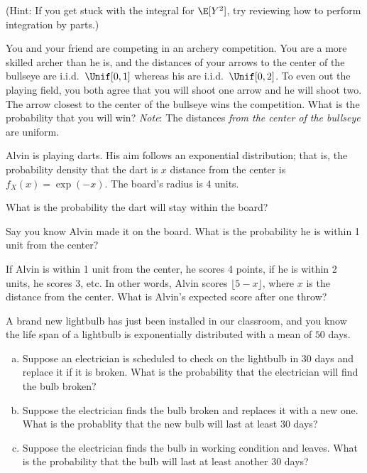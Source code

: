 (Hint: If you get stuck with the integral for $\E[Y^2]$, try reviewing how to perform integration by parts.)


You and your friend are competing in an archery competition. You are a more skilled archer than he is, and the distances of your arrows to the center of the bullseye are i.i.d.\ $\Unif[0,1]$ whereas his are i.i.d.\ $\Unif[0, 2]$. To even out the playing field, you both agree that you will shoot one arrow and he will shoot two. The arrow closest to the center of the bullseye wins the competition. What is the probability that you will win? \textit{Note}: The distances \textit{from the center of the bullseye} are uniform.
\nosolspace{6cm}



Alvin is playing darts.
His aim follows an exponential distribution; that is, the probability density that the dart is $x$ distance from the center is $f_X(x) = \exp(-x)$.
The board's radius is 4 units.

\begin{Parts}
        \Part What is the probability the dart will stay within the board?
        
        \Part Say you know Alvin made it on the board. What is the probability he is within 1 unit from the center?
        
        \Part If Alvin is within 1 unit from the center, he scores 4 points, if he is within 2 units, he scores 3, etc. In other words, Alvin scores $\lfloor 5 - x\rfloor$, where $x$ is the distance from the center.  What is Alvin's expected score after one throw?
\end{Parts}




A brand new lightbulb has just been installed in our classroom, and
you know the life span of a lightbulb is exponentially distributed
with a mean of $50$ days.

\begin{enumerate}[(a)]
\item Suppose an electrician is scheduled to check on the lightbulb in $30$
days and replace it if it is broken. What is the probability that
the electrician will find the bulb broken?
\nosolspace{2cm}
\item Suppose the electrician finds the bulb broken and replaces it with
a new one. What is the probablity that the new bulb will last at least
$30$ days?
\nosolspace{2cm}
\item Suppose the electrician finds the bulb in working condition and leaves.
What is the probability that the bulb will last at least another $30$
days?
\nosolspace{2cm}
\end{enumerate}



